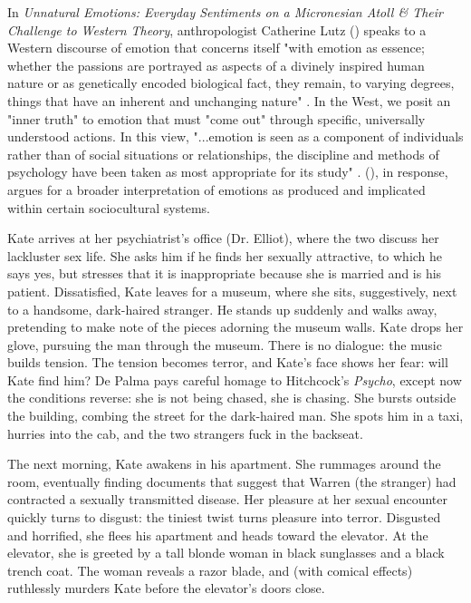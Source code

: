 \documentclass[letterpaper,12pt]{turabian-researchpaper}
\begin{document}
In \textit{Unnatural Emotions: Everyday Sentiments on a Micronesian Atoll \& Their Challenge to Western Theory}, anthropologist Catherine Lutz (\citeyear{lutz_unnatural_1988}) speaks to a Western discourse of emotion that concerns itself "with emotion as essence; whether the passions are portrayed as aspects of a divinely inspired human nature or as genetically encoded biological fact, they remain, to varying degrees, things that have an inherent and unchanging nature" \autocite[53]{lutz_unnatural_1988}. In the West, we posit an "inner truth" to emotion that must "come out" through specific, universally understood actions. In this view, "...emotion is seen as a component of individuals rather than of social situations or relationships, the discipline and methods of psychology have been taken as most appropriate for its study" \autocite[41]{lutz_unnatural_1988}. \citeauthor{lutz_unnatural_1988} (\citeyear{lutz_unnatural_1988}), in response, argues for a broader interpretation of emotions as produced and implicated within certain sociocultural systems.

Kate arrives at her psychiatrist's office (Dr. Elliot), where the two discuss her lackluster sex life. She asks him if he finds her sexually attractive, to which he says yes, but stresses that it is inappropriate because she is married and is his patient. Dissatisfied, Kate leaves for a museum, where she sits, suggestively, next to a handsome, dark-haired stranger. He stands up suddenly and walks away, pretending to make note of the pieces adorning the museum walls. Kate drops her glove, pursuing the man through the museum. There is no dialogue: the music builds tension. The tension becomes terror, and Kate's face shows her fear: will Kate find him? De Palma pays careful homage to Hitchcock's \textit{Psycho}, except now the conditions reverse: she is not being chased, she is chasing. She bursts outside the building, combing the street for the dark-haired man. She spots him in a taxi, hurries into the cab, and the two strangers fuck in the backseat.

The next morning, Kate awakens in his apartment. She rummages around the room, eventually finding documents that suggest that Warren (the stranger) had contracted a sexually transmitted disease. Her pleasure at her sexual encounter quickly turns to disgust: the tiniest twist turns pleasure into terror. Disgusted and horrified, she flees his apartment and heads toward the elevator. At the elevator, she is greeted by a tall blonde woman in black sunglasses and a black trench coat. The woman reveals a razor blade, and (with comical effects) ruthlessly murders Kate before the elevator's doors close.
\end{document}
